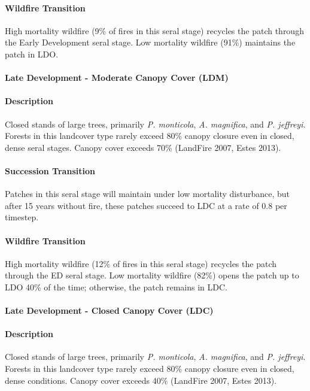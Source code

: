 \paragraph{Wildfire Transition} High mortality wildfire (9\% of fires in this seral stage) recycles the patch through the Early Development seral stage. Low mortality wildfire (91\%) maintains the patch in LDO.

\noindent\hrulefill

\paragraph{Late Development - Moderate Canopy Cover (LDM)}

\paragraph{Description} Closed stands of large trees, primarily \emph{P. monticola}, \emph{A. magnifica}, and \emph{P. jeffreyi}. Forests in this landcover type rarely exceed 80\% canopy closure even in closed, dense seral stages. Canopy cover exceeds 70\% (LandFire 2007, Estes 2013).

\paragraph{Succession Transition} Patches in this seral stage will maintain under low mortality disturbance, but after 15 years without fire, these patches succeed to LDC at a rate of 0.8 per timestep.

\paragraph{Wildfire Transition} High mortality wildfire (12\% of fires in this seral stage) recycles the patch through the ED seral stage. Low mortality wildfire (82\%) opens the patch up to LDO 40\% of the time; otherwise, the patch remains in LDC.

\noindent\hrulefill

\paragraph{Late Development - Closed Canopy Cover (LDC)}

\paragraph{Description} Closed stands of large trees, primarily \emph{P. monticola}, \emph{A. magnifica}, and \emph{P. jeffreyi}. Forests in this landcover type rarely exceed 80\% canopy closure even in closed, dense conditions. Canopy cover exceeds 40\% (LandFire 2007, Estes 2013).

